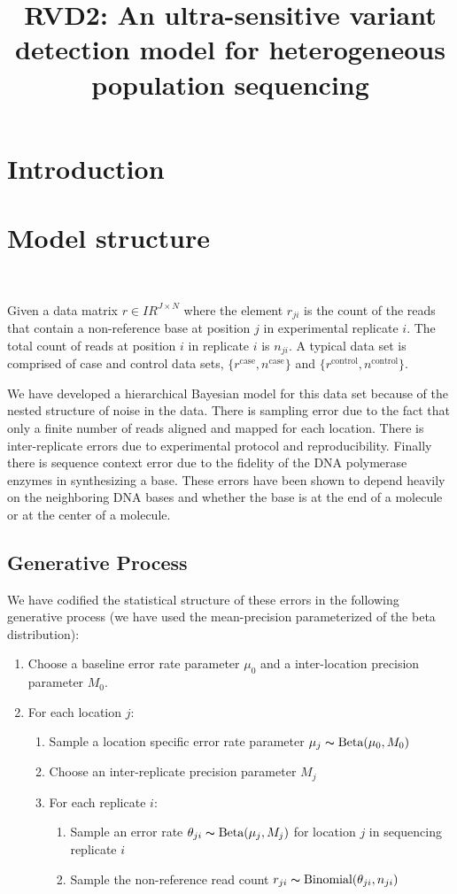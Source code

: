 \documentclass[11pt,reqno]{amsart}
\title{RVD2: An ultra-sensitive variant detection model for heterogeneous population sequencing}
\author{}
\newcommand{\RR}{I\!\!R} %
\begin{document}
\maketitle

\section{Introduction}

\section{Model structure}\

Given a data matrix $r \in \RR^{J \times N}$ where the element $r_{ji}$ is the count of the reads that contain a non-reference base at position $j$ in experimental replicate $i$. The total count of reads at position $i$ in replicate $i$ is $n_{ji}$. A typical data set is comprised of case and control data sets, $\{ r^{\text{case}} , n^{\text{case}} \}$ and  $\{ r^{\text{control}} , n^{\text{control}} \}$. 

We have developed a hierarchical Bayesian model for this data set because of the nested structure of noise in the data. There is sampling error due to the fact that only a finite number of reads aligned and mapped for each location. There is inter-replicate errors due to experimental protocol and reproducibility. Finally there is sequence context error due to the fidelity of the DNA polymerase enzymes in synthesizing a base. These errors have been shown to depend heavily on the neighboring DNA bases and whether the base is at the end of a molecule or at the center of a molecule.

\subsection{Generative Process} We have codified the statistical structure of these errors in the following generative process (we have used the mean-precision parameterized of the beta distribution): 

\begin{enumerate}
	\item Choose a baseline error rate parameter $\mu_0$ and a inter-location precision parameter $M_0$.
	\item For each location $j$:
	\begin{enumerate}
		\item Sample a location specific error rate parameter $\mu_j \thicksim \text{Beta}(\mu_0, M_0)$
		\item Choose an inter-replicate precision parameter $M_j$
		\item For each replicate $i$:
		\begin{enumerate}
			\item Sample an error rate $\theta_{ji} \thicksim \text{Beta}(\mu_j, M_j)$ for location $j$ in sequencing replicate $i$
			\item Sample the non-reference read count $r_{ji} \thicksim \text{Binomial}(\theta_{ji}, n_{ji})$
		\end{enumerate}
	\end{enumerate}
\end{enumerate}
\end{document}
